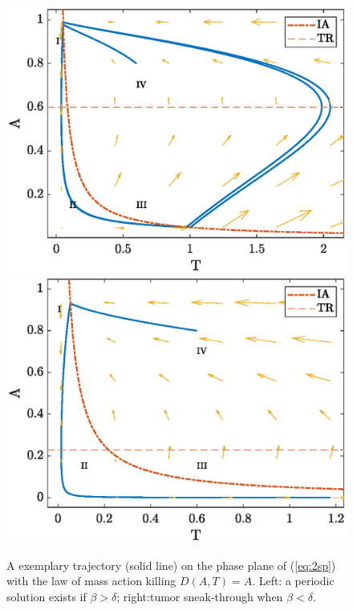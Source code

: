 \documentclass[review,authoryear]{elsarticle}
\begin{document}
\begin{figure}
\centerline{\includegraphics[width=0.3\paperwidth]{figs/phase_plane_periodic_DA}\includegraphics[width=0.3\paperwidth]{figs/phase_plane_sneakthru_DA}}
\caption{A exemplary trajectory (solid line) on the phase plane of (\ref{eq:2sp}) with the law of mass action killing $D(A,T)=A$. Left: a periodic solution exists if $\beta>\delta$;
right:tumor sneak-through when $\beta<\delta$.\label{fig:PP-DA} }
\end{figure}
\end{document}
